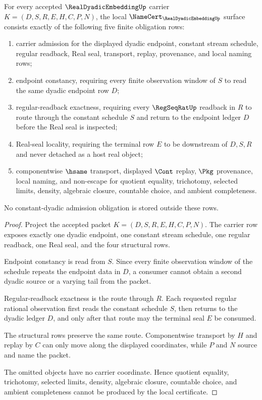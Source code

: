 \begin{theorem}
\label{thm:real-dyadic-embedding-namecert-obligations}
For every accepted $\RealDyadicEmbeddingUp$ carrier $K=(D,S,R,E,H,C,P,N)$, the local $\NameCert_{\RealDyadicEmbeddingUp}$ surface consists exactly of the following five finite obligation rows:
\begin{enumerate}
\item carrier admission for the displayed dyadic endpoint, constant stream schedule, regular readback, Real seal, transport, replay, provenance, and local naming rows;
\item endpoint constancy, requiring every finite observation window of $S$ to read the same dyadic endpoint row $D$;
\item regular-readback exactness, requiring every $\RegSeqRatUp$ readback in $R$ to route through the constant schedule $S$ and return to the endpoint ledger $D$ before the Real seal is inspected;
\item Real-seal locality, requiring the terminal row $E$ to be downstream of $D,S,R$ and never detached as a host real object;
\item componentwise $\hsame$ transport, displayed $\Cont$ replay, $\Pkg$ provenance, local naming, and non-escape for quotient equality, trichotomy, selected limits, density, algebraic closure, countable choice, and ambient completeness.
\end{enumerate}
No constant-dyadic admission obligation is stored outside these rows.
\end{theorem}
\begin{proof}
Project the accepted packet $K=(D,S,R,E,H,C,P,N)$. The carrier row exposes exactly one dyadic endpoint, one constant stream schedule, one regular readback, one Real seal, and the four structural rows.

Endpoint constancy is read from $S$. Since every finite observation window of the schedule repeats the endpoint data in $D$, a consumer cannot obtain a second dyadic source or a varying tail from the packet.

Regular-readback exactness is the route through $R$. Each requested regular rational observation first reads the constant schedule $S$, then returns to the dyadic ledger $D$, and only after that route may the terminal seal $E$ be consumed.

The structural rows preserve the same route. Componentwise transport by $H$ and replay by $C$ can only move along the displayed coordinates, while $P$ and $N$ source and name the packet.

The omitted objects have no carrier coordinate. Hence quotient equality, trichotomy, selected limits, density, algebraic closure, countable choice, and ambient completeness cannot be produced by the local certificate.
\end{proof}

